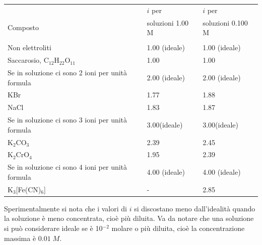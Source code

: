 \begin{center}
    \begin{tabular}{p{9cm}p{3.5cm}p{3.5cm}}
        & \hspace{1cm}$i$ per & \hspace{1cm}$i$ per\\
        Composto & soluzioni 1.00 M & soluzioni 0.100 M\\[0.5 ex]
        \hline\\[-0.4cm]
        Non elettroliti & 1.00 (ideale) & 1.00 (ideale)\\[0.5 ex]
        Saccarosio, C$_{12}$H$_{22}$O$_{11}$ & 1.00 & 1.00\\[0.5 ex]
        Se in soluzione ci sono 2 ioni per unità formula & 2.00 (ideale) & 2.00 (ideale)\\[0.5 ex]
        KBr & 1.77 & 1.88\\[0.5 ex]
        NaCl & 1.83 & 1.87\\[0.5 ex]
        Se in soluzione ci sono 3 ioni per unità formula & 3.00(ideale) & 3.00(ideale)\\[0.5 ex]
        K$_2$CO$_3$ & 2.39 & 2.45 \\[0.5 ex]
        K$_2$CrO$_4$ & 1.95 & 2.39\\[0.5 ex]
        Se in soluzione ci sono 4 ioni per unità formula & 4.00 (ideale) & 4.00 (ideale)\\[0.5 ex]
        K$_3$[Fe(CN)$_6$] & - & 2.85\\[0.5 ex]
    \end{tabular}
\end{center}

Sperimentalmente si nota che i valori di $i$ si discostano meno dall'idealità quando la soluzione è meno concentrata, cioè più diluita. Va da notare che una soluzione si può considerare ideale se è 10$^{-2}$ molare o più diluita, cioè la concentrazione massima è $0.01\;M$.